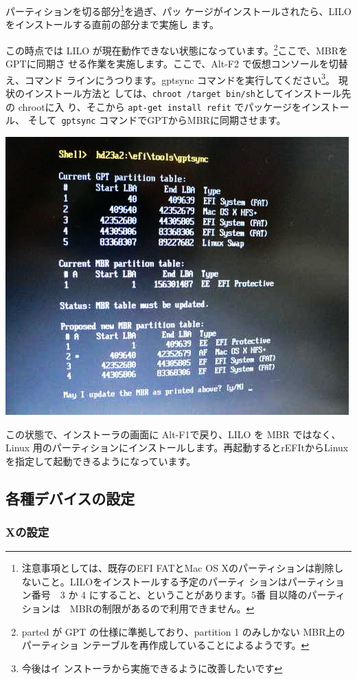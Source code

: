 \documentclass[mingoth,a4paper]{jsarticle}
\begin{document}
パーティションを切る部分\footnote{注意事項としては、既存のEFI FATとMac
OS Xのパーティションは削除しないこと。LILOをインストールする予定のパーティ
ションはパーティション番号　3 か 4 にすること、ということがあります。5番
目以降のパーティションは　MBRの制限があるので利用できません。}を過ぎ、パッ
ケージがインストールされたら、LILOをインストールする直前の部分まで実施し
ます。

この時点では LILO が現在動作できない状態になっています。\footnote{parted 
が GPT の仕様に準拠しており、partition 1 のみしかない MBR上のパーティショ
ンテーブルを再作成していることによるようです。}ここで、MBRをGPTに同期さ
せる作業を実施します。ここで、Alt-F2 で仮想コンソールを切替え、コマンド
ラインにうつります。gptsync コマンドを実行してください\footnote{今後はイ
ンストーラから実施できるように改善したいです}。 現状のインストール方法と
しては、\texttt{chroot /target bin/sh}としてインストール先の chrootに入
り、そこから \texttt{apt-get install refit} でパッケージをインストール、
そして\texttt{ gptsync} コマンドでGPTからMBRに同期させます。

\includegraphics[width=0.9\hsize]{image200607/gptsync.png}

この状態で、インストーラの画面に Alt-F1で戻り、LILO を MBR ではなく、
Linux 用のパーティションにインストールします。再起動するとrEFItからLinux
を指定して起動できるようになっています。

\subsection{各種デバイスの設定}
\subsubsection{Xの設定}
\end{document}
